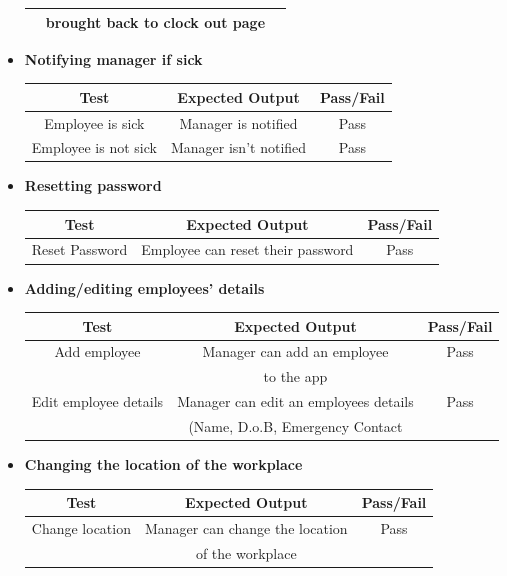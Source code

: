 \begin{itemize}
\begin{center}
\begin{tabular}{||c c c||}
        & brought back to clock out page &   \\
      \hline
     \end{tabular}
    \end{center}
    \item \textbf{Notifying manager if sick}
    \begin{center}
     \begin{tabular}{||c c c||} 
      \hline
      Test & Expected Output & Pass/Fail \\ [0.5ex] 
      \hline\hline
      Employee is sick & Manager is notified & Pass \\
      \hline
      Employee is not sick & Manager isn't notified & Pass \\
      \hline
     \end{tabular}
    \end{center}
    \item \textbf{Resetting password}
    \begin{center}
     \begin{tabular}{||c c c||} 
      \hline
      Test & Expected Output & Pass/Fail \\ [0.5ex] 
      \hline\hline
      Reset Password & Employee can reset their password & Pass \\
      \hline
     \end{tabular}
    \end{center}
    \item \textbf{Adding/editing employees' details}
    \begin{center}
     \begin{tabular}{||c c c||} 
      \hline
      Test & Expected Output & Pass/Fail \\ [0.5ex] 
      \hline\hline
      Add employee & Manager can add an employee & Pass \\
        & to the app &   \\
      \hline
      Edit employee details & Manager can edit an employees details & Pass \\
       & (Name, D.o.B, Emergency Contact &  \\
      \hline
     \end{tabular}
    \end{center}
    \item \textbf{Changing the location of the workplace}
    \begin{center}
     \begin{tabular}{||c c c||} 
      \hline
      Test & Expected Output & Pass/Fail \\ [0.5ex] 
      \hline\hline
      Change location & Manager can change the location & Pass \\
        & of the workplace &   \\
      \hline
     \end{tabular}
    \end{center}
\end{itemize}


